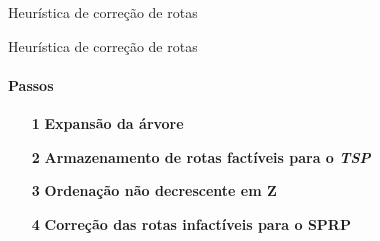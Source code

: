 \documentclass[12pt]{beamer}
\begin{document}
\begin{frame}{Heur\'istica de corre\c{c}\~ao de rotas}
{\begin{minipage}[t]{0.48\linewidth}
	\end{minipage}}%
	\hfill%
	{%
		\noindent{}}%
	\hfill%
	
\end{frame}

\begin{frame}{Heur\'istica de corre\c{c}\~ao de rotas}
	\framesubtitle{Passos}
	\begin{itemize}
		\item[\bfseries 1] {\bfseries Expans\~ao da \'arvore}
		\pause
		\item[\bfseries 2] {\bfseries Armazenamento de rotas fact\'iveis para o \textit{TSP} }
		\pause
		\item[\bfseries 3] {\bfseries Ordena\c{c}\~ao n\~ao decrescente em Z}
		\pause
		\item[\bfseries 4] {\bfseries Corre\c{c}\~ao das rotas infact\'iveis para o SPRP}
	\end{itemize}
\end{frame}
\end{document}
